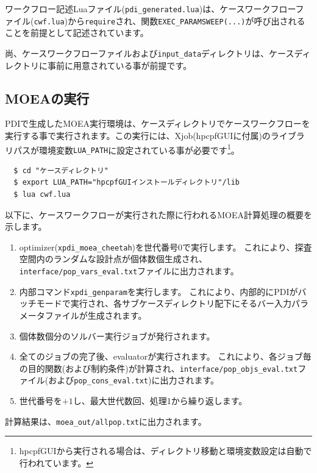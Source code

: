 \documentclass[a4paper,11pt]{jarticle}
\begin{document}
{ワークフロー記述Luaファイル({\tt pdi\_generated.lua})は、ケースワークフローファイル({\tt cwf.lua})から{\tt require}され、関数{\tt EXEC\_PARAMSWEEP(...)}が呼び出されることを前提として記述されています。

尚、ケースワークフローファイルおよび{\tt input\_data}ディレクトリは、ケースディレクトリに事前に用意されている事が前提です。


\subsection{MOEAの実行}

PDIで生成したMOEA実行環境は、ケースディレクトリでケースワークフローを実行する事で実行されます。この実行には、Xjob(hpcpfGUIに付属)のライブラリパスが環境変数{\tt LUA\_PATH}に設定されている事が必要です\footnote{hpcpfGUIから実行される場合は、ディレクトリ移動と環境変数設定は自動で行われています。}。

\begin{verbatim}
  $ cd "ケースディレクトリ"
  $ export LUA_PATH="hpcpfGUIインストールディレクトリ"/lib
  $ lua cwf.lua
\end{verbatim}

以下に、ケースワークフローが実行された際に行われるMOEA計算処理の概要を示します。

\begin{enumerate}
\item optimizer({\tt xpdi\_moea\_cheetah})を世代番号0で実行します。
これにより、探査空間内のランダムな設計点が個体数個生成され、{\tt interface/pop\_vars\_eval.txt}ファイルに出力されます。

\item 内部コマンド{\tt xpdi\_genparam}を実行します。
これにより、内部的にPDIがバッチモードで実行され、各サブケースディレクトリ配下にそるバー入力パラメータファイルが生成されます。

\item 個体数個分のソルバー実行ジョブが発行されます。

\item 全てのジョブの完了後、evaluatorが実行されます。
これにより、各ジョブ毎の目的関数(および制約条件)が計算され、{\tt interface/pop\_objs\_eval.txt}ファイル(および{\tt pop\_cons\_eval.txt})に出力されます。

\item 世代番号を$+1$し、最大世代数回、処理1から繰り返します。
\end{enumerate}

計算結果は、{\tt moea\_out/allpop.txt}に出力されます。


}
\end{document}
